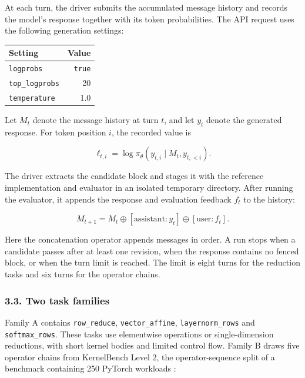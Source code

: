 \documentclass[
  11pt,
]{article}
\begin{document}
At each turn, the driver submits the accumulated message history and
records the model's response together with its token probabilities. The
API request uses the following generation settings:

\begin{center}
\begin{minipage}{\linewidth}
\centering
\begin{tabular}{@{}lr@{}}
\toprule
Setting & Value \\
\midrule

\texttt{logprobs} & \texttt{true} \\
\texttt{top\_logprobs} & 20 \\
\texttt{temperature} & 1.0 \\
\bottomrule
\end{tabular}
\end{minipage}
\end{center}

Let \(M_t\) denote the message history at turn \(t\), and let \(y_t\)
denote the generated response. For token position \(i\), the recorded
value is

\[
\ell_{t,i}=\log\pi_\theta\!\left(y_{t,i}\mid M_t,y_{t,<i}\right).
\]

The driver extracts the candidate block and stages it with the reference
implementation and evaluator in an isolated temporary directory. After
running the evaluator, it appends the response and evaluation feedback
\(f_t\) to the history:

\[
M_{t+1}=M_t\oplus[\mathrm{assistant}:y_t]
\oplus[\mathrm{user}:f_t].
\]

Here the concatenation operator appends messages in order. A run stops
when a candidate passes after at least one revision, when the response
contains no fenced block, or when the turn limit is reached. The limit
is eight turns for the reduction tasks and six turns for the operator
chains.

\hypertarget{two-task-families}{%
\subsubsection{3.3. Two task families}\label{two-task-families}}

Family A contains \texttt{row\_reduce}, \texttt{vector\_affine},
\texttt{layernorm\_rows} and \texttt{softmax\_rows}. These tasks use
elementwise operations or single-dimension reductions, with short kernel
bodies and limited control flow. Family B draws five operator chains
from KernelBench Level 2, the operator-sequence split of a benchmark
containing 250 PyTorch workloads \citep{kernelbench}:
\end{document}
